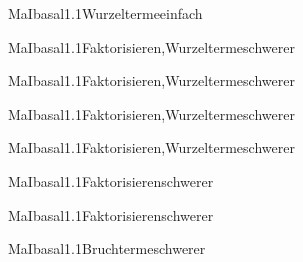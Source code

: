 \documentclass[12pt]{article}
\begin{document}
\begin{Add}{MaI}{basal1.1}{Wurzelterme}{einfach}
\end{Add}

\begin{Add}{MaI}{basal1.1}{Faktorisieren,Wurzelterme}{schwerer}
\end{Add}

\begin{Add}{MaI}{basal1.1}{Faktorisieren,Wurzelterme}{schwerer}
\end{Add}

\begin{Add}{MaI}{basal1.1}{Faktorisieren,Wurzelterme}{schwerer}
\end{Add}
\begin{Add}{MaI}{basal1.1}{Faktorisieren,Wurzelterme}{schwerer}
\end{Add}

\begin{Add}{MaI}{basal1.1}{Faktorisieren}{schwerer}
\end{Add}

\begin{Add}{MaI}{basal1.1}{Faktorisieren}{schwerer}
\end{Add}

\begin{Add}{MaI}{basal1.1}{Bruchterme}{schwerer}
\end{Add}
\end{document}
